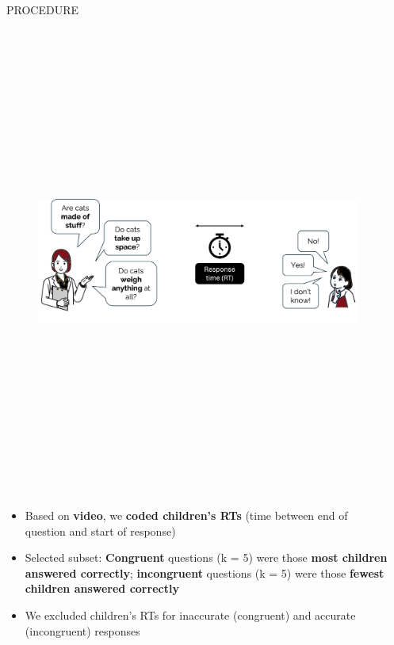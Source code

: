 \documentclass[final]{beamer}
\newlength{\colwidth}
\newlength{\widecolwidth}
\begin{document}
\begin{frame}[t]
\begin{columns}[t]
\begin{column}{\colwidth}
\begin{block}{PROCEDURE}
    \begin{figure}
      \centering
	{\includegraphics[height=15.5cm]{images/procedure6.png}}\\[-1ex]
    \end{figure}

    \begin{itemize}
	\item Based on \textbf{video}, we \textbf{coded children's RTs} (time between end of question and start of response)
	\item Selected subset: \textbf{Congruent} questions (k = 5) were those \textbf{most children answered correctly}; \textbf{incongruent} questions (k = 5) were those \textbf{fewest children answered correctly}
	\item We excluded children's RTs for inaccurate (congruent) and accurate (incongruent) responses
    \end{itemize}
    
  \end{block}

\end{column}

\begin{column}{\widecolwidth}


\end{column}
\end{columns}
\end{frame}
\end{document}

